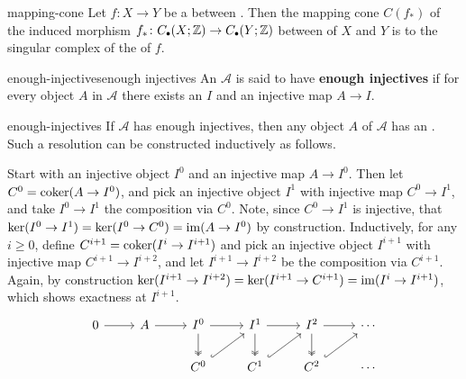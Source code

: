 \begin{example}{mapping-cone}
    Let $f \colon X \to Y$ be a  between . Then the mapping cone $C(f_*)$ of the induced morphism $f_* \colon C_\bdot(X; \ZZ) \to C_\bdot(Y; \ZZ)$ between  of $X$ and $Y$ is  to the singular complex of the  of $f$.
\end{example}

\begin{topic}{enough-injectives}{enough injectives}
    An  $\mathcal{A}$ is said to have \textbf{enough injectives} if for every object $A$ in $\mathcal{A}$ there exists an  $I$ and an injective map $A \to I$.
\end{topic}

\begin{example}{enough-injectives}
    If $\mathcal{A}$ has enough injectives, then any object $A$ of $\mathcal{A}$ has an . Such a resolution can be constructed inductively as follows.
    
    Start with an injective object $I^0$ and an injective map $A \to I^0$. Then let $C^0 = \operatorname{coker} (A \to I^0)$, and pick an injective object $I^1$ with injective map $C^0 \to I^1$, and take $I^0 \to I^1$ the composition via $C^0$. Note, since $C^0 \to I^1$ is injective, that $\ker (I^0 \to I^1) = \ker(I^0 \to C^0) = \operatorname{im} (A \to I^0)$ by construction. Inductively, for any $i \ge 0$, define $C^{i + 1} = \operatorname{coker}(I^i \to I^{i + 1})$ and pick an injective object $I^{i + 1}$ with injective map $C^{i + 1} \to I^{i + 2}$, and let $I^{i + 1} \to I^{i + 2}$ be the composition via $C^{i + 1}$. Again, by construction $\ker (I^{i + 1} \to I^{i + 2}) = \ker (I^{i + 1} \to C^{i + 1}) = \operatorname{im} (I^i \to I^{i + 1})$, which shows exactness at $I^{i + 1}$.
    \[ \svg \begin{tikzcd}
        0 \arrow{r} & A \arrow{r} & I^0 \arrow[twoheadrightarrow]{d} \arrow{r} & I^1 \arrow[twoheadrightarrow]{d} \arrow{r} & I^2 \arrow[twoheadrightarrow]{d} \arrow{r} & \cdots \\
        & & C^0 \arrow[hookrightarrow]{ur} & C^1 \arrow[hookrightarrow]{ur} & C^2 \arrow[hookrightarrow]{ur} & \cdots
    \end{tikzcd} \]
\end{example}

